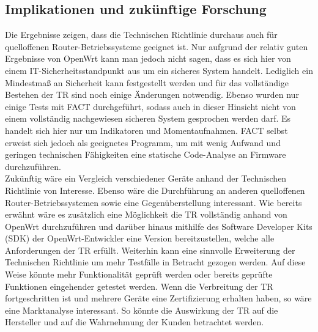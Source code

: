 \documentclass[a4paper]{book}
\begin{document}
\begin{large}
\section{Implikationen und zukünftige Forschung}
\label{implikationen}
\begin{onehalfspace}
Die Ergebnisse zeigen, dass die Technischen Richtlinie durchaus auch für quelloffenen Router-Betriebssysteme geeignet ist. Nur aufgrund der relativ guten Ergebnisse von \mbox OpenWrt kann man jedoch nicht sagen, dass es sich hier von einem IT-Sicherheitsstandpunkt aus um ein sicheres System handelt. Lediglich ein Mindestmaß an Sicherheit kann festgestellt werden und für das vollständige Bestehen der TR sind noch einige Änderungen notwendig. Ebenso wurden nur einige Tests mit FACT durchgeführt, sodass auch in dieser Hinsicht nicht von einem vollständig nachgewiesen sicheren System gesprochen werden darf. Es handelt sich hier nur um Indikatoren und Momentaufnahmen. FACT selbst erweist sich jedoch als geeignetes Programm, um mit wenig Aufwand und geringen technischen Fähigkeiten eine statische Code-Analyse an Firmware durchzuführen.  \\ \indent
	Zukünftig wäre ein Vergleich verschiedener Geräte anhand der Technischen Richtlinie von Interesse. Ebenso wäre die Durchführung an anderen quelloffenen Router-Betriebssystemen sowie eine Gegenüberstellung interessant. Wie bereits erwähnt wäre es zusätzlich eine Möglichkeit die TR vollständig anhand von OpenWrt durchzuführen und darüber hinaus mithilfe des \glqq Software Developer Kits\grqq{} (SDK) der OpenWrt-Entwickler eine Version bereitzustellen, welche alle Anforderungen der TR erfüllt. Weiterhin kann eine sinnvolle Erweiterung der Technischen Richtlinie um mehr Testfälle in Betracht gezogen werden. Auf diese Weise könnte mehr Funktionalität geprüft werden oder bereits geprüfte Funktionen eingehender getestet werden. Wenn die Verbreitung der TR fortgeschritten ist und mehrere Geräte eine Zertifizierung erhalten haben, so wäre eine Marktanalyse interessant. So könnte die Auswirkung der TR auf die Hersteller und auf die Wahrnehmung der Kunden betrachtet werden.
\end{onehalfspace}

\vfill \pagebreak 





\end{large}
\end{document}
